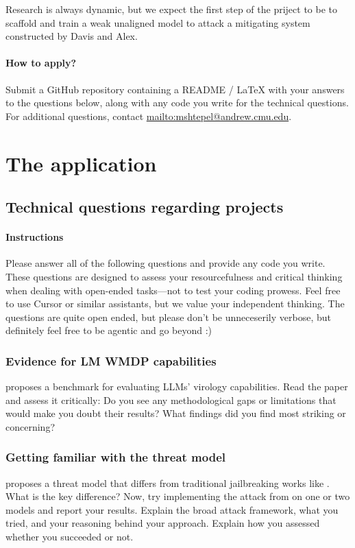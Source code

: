 \documentclass[11pt]{article}
\begin{document}
Research is always dynamic, but we expect the first step of the priject to be to scaffold and train a weak unaligned model to attack a mitigating system constructed by Davis and Alex.

\paragraph{How to apply?}
Submit a GitHub repository containing a README / LaTeX with your answers to the questions below, along with any code you write for the technical questions.
For additional questions, contact \url{mailto:mshtepel@andrew.cmu.edu}.




\section{The application}




\subsection{Technical questions regarding projects}

\paragraph{Instructions}
Please answer all of the following questions and provide any code you write.
These questions are designed to assess your resourcefulness and critical thinking when dealing with open-ended tasks---not to test your coding prowess.
Feel free to use Cursor or similar assistants, but we value your independent thinking.
The questions are quite open ended, but please don't be unneceserily verbose, but definitely feel free to be agentic and go beyond :) 



\subsubsection{Evidence for LM WMDP capabilities}
\cite{gotting2025virology} proposes a benchmark for evaluating LLMs' virology capabilities.
Read the paper and assess it critically: Do you see any methodological gaps or limitations that would make you doubt their results?
What findings did you find most striking or concerning?  

\subsubsection{Getting familiar with the threat model}
\cite{jones2024adversariesb} proposes a threat model that differs from traditional jailbreaking works like \cite{chao2024jailbreakinga}.
What is the key difference?
Now, try implementing the attack from \cite{jones2024adversariesb} on one or two models and report your results.
Explain the broad attack framework, what you tried, and your reasoning behind your approach. 
Explain how you assessed whether you succeeded or not.
\end{document}
